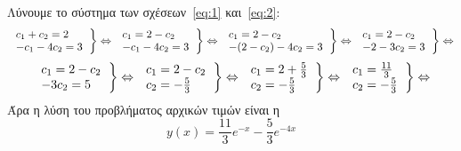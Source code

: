 \begin{enumerate}
    Λύνουμε το σύστημα των σχέσεων~\eqref{eq:1} και~\eqref{eq:2}:
    \[
      \left.
        \begin{tabular}{l}
          $c_{1}+ c_{2}=2 $ \\
          $-c_{1}- 4 c_{2}=3$
        \end{tabular}
      \right\} \Leftrightarrow 
      \left.
        \begin{tabular}{l}
          $c_{1}=2- c_{2} $ \\
          $-c_{1}- 4 c_{2}=3$
        \end{tabular}  
      \right\} \Leftrightarrow 
      \left.
        \begin{tabular}{l}
          $c_{1}=2- c_{2} $ \\
          $-(2- c_{2})- 4 c_{2}=3$
        \end{tabular}  
      \right\} \Leftrightarrow 
      \left.
        \begin{tabular}{l}
          $c_{1}=2- c_{2} $ \\
          $-2- 3c_{2}=3$
        \end{tabular}  
      \right\} \Leftrightarrow 
    \]
    \[
      \left.
        \begin{tabular}{l}
          $c_{1}=2- c_{2} $ \\
          $ -3c_{2}=5$
        \end{tabular}  
      \right\} \Leftrightarrow 
      \left.
        \begin{tabular}{l}
          $c_{1}=2- c_{2} $ \\
          $ c_{2}= -\frac{5}{3} $
        \end{tabular}  
      \right\} \Leftrightarrow 
      \left.
        \begin{tabular}{l}
          $c_{1}=2 + \frac{5}{3}  $ \\
          $ c_{2}= -\frac{5}{3} $
        \end{tabular}  
      \right\} \Leftrightarrow 
      \left.
        \begin{tabular}{l}
          $c_{1}= \frac{11}{3}  $ \\
          $ c_{2}= -\frac{5}{3} $
        \end{tabular}  
      \right\} \Leftrightarrow 
    \] 
    Άρα η λύση του προβλήματος αρχικών τιμών είναι η 
    \[
      \boxed {  y(x)= \frac{11}{3} e^{-x} - \frac{5}{3} e^{-4x} }
    \]




\end{enumerate}



